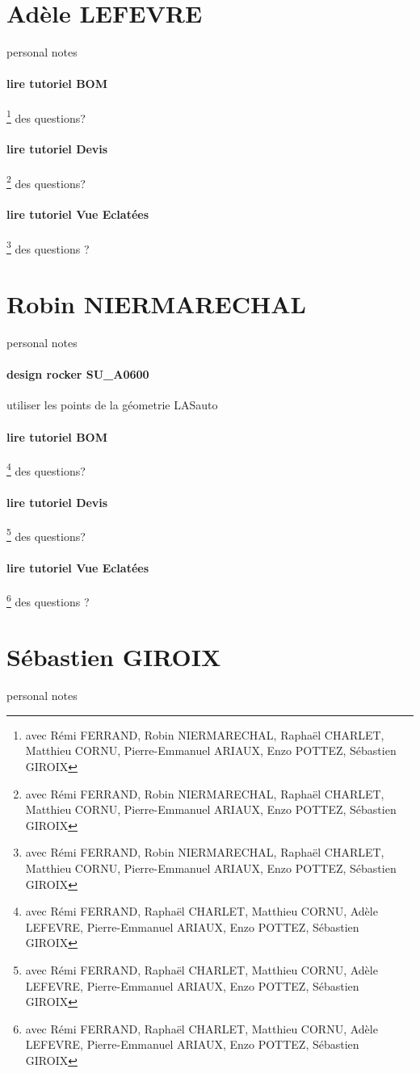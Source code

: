 \newpage \section*{Adèle LEFEVRE} 
 \par personal notes
\paragraph{lire tutoriel BOM} \footnote{avec Rémi FERRAND, Robin NIERMARECHAL, Raphaël CHARLET, Matthieu CORNU, Pierre-Emmanuel ARIAUX, Enzo POTTEZ, Sébastien GIROIX} des questions?
\paragraph{lire tutoriel Devis} \footnote{avec Rémi FERRAND, Robin NIERMARECHAL, Raphaël CHARLET, Matthieu CORNU, Pierre-Emmanuel ARIAUX, Enzo POTTEZ, Sébastien GIROIX} des questions?
\paragraph{lire tutoriel Vue Eclatées} \footnote{avec Rémi FERRAND, Robin NIERMARECHAL, Raphaël CHARLET, Matthieu CORNU, Pierre-Emmanuel ARIAUX, Enzo POTTEZ, Sébastien GIROIX} des questions ?
\newpage \section*{Robin NIERMARECHAL} 
 \par personal notes
\paragraph{design rocker SU\_A0600} utiliser les points de la géometrie LASauto
\paragraph{lire tutoriel BOM} \footnote{avec Rémi FERRAND, Raphaël CHARLET, Matthieu CORNU, Adèle LEFEVRE, Pierre-Emmanuel ARIAUX, Enzo POTTEZ, Sébastien GIROIX} des questions?
\paragraph{lire tutoriel Devis} \footnote{avec Rémi FERRAND, Raphaël CHARLET, Matthieu CORNU, Adèle LEFEVRE, Pierre-Emmanuel ARIAUX, Enzo POTTEZ, Sébastien GIROIX} des questions?
\paragraph{lire tutoriel Vue Eclatées} \footnote{avec Rémi FERRAND, Raphaël CHARLET, Matthieu CORNU, Adèle LEFEVRE, Pierre-Emmanuel ARIAUX, Enzo POTTEZ, Sébastien GIROIX} des questions ?
\newpage \section*{Sébastien GIROIX} 
 \par personal notes
